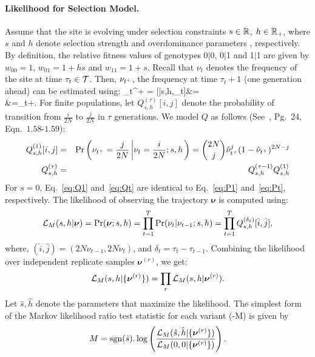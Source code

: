 \paragraph{Likelihood for Selection Model.}
Assume that the site is evolving under selection constraints $s\in
{\mathbb R}$, $h\in {\mathbb R}_+$, where $s$ and $h$ denote selection strength and 
overdominance parameters ,
respectively. By definition, the relative fitness values of genotypes
0$|$0, 0$|$1 and 1$|$1 are given by $w_{00}=1$, $w_{01}=1+hs$ and
$w_{11}=1+s$. Recall that $\nu_t$ denotes the frequency of the site at
time $\tau_t\in {\cal T}$. Then, $\nu_{t^+}$, the frequency at time
$\tau_{t}+1$ (one generation ahead) can be estimated using: \beq 
\hat{\nu}_{t^+} =
[\nusp|s,h,\nu_t]&=\\
&=\nu_t+.
  \label{eq:transition}
\eeq
For finite populations, let $Q^{(\tau)}_{s,h}[i,j]$ denote the
probability of transition from $\frac{i}{2N}$ to $\frac{j}{2N}$ in
$\tau$ generations. We model $Q$ as follows
(See~\cite{Ewens2012Mathematical}, Pg.~24, Eqn.~$1.58$-$1.59$):
\begin{eqnarray}
  Q^{(1)}_{s,h}[i,j] &=& \operatorname{Pr}\left(\nu_{t^+}=\frac{j}{2N} \left\lvert
      \nu_{t}=\frac{i}{2N};s,h \right .\right)={2N \choose j}
  \hat{\nu}_{t^+}^{j} (1-\hat{\nu}_{t^+})^{2N-j}\label{eq:Q1}\\
  Q^{(\tau)}_{s,h} &=& Q^{(\tau-1)}_{s,h}Q^{(1)}_{s,h}\label{eq:Qt}
  \label{eq:mkvs}   
\end{eqnarray}
For $s=0$, Eq.~\ref{eq:Q1} and~\ref{eq:Qt} are identical to
Eq.~\ref{eq:P1} and~\ref{eq:Pt}, respectively.  The likelihood of
observing the trajectory $\bm{\nu}$ is computed using:
\begin{equation}
  {\cal L}_M(s,h|\bm{\nu}) = \operatorname{Pr}(\bm{\nu};s,h)=
  \prod_{t=1}^{T} \operatorname{Pr}(\nu_{t}|\nu_{t-1};s,h) = \prod_{t=1}^{T} 
  Q^{(\delta_t)}_{s,h}[\hat{i},\hat{j}],
\end{equation}
where, $(\hat{i},\hat{j})=( 2N\nu_{t-1}, 2N\nu_{t})$, and
$\delta_t=\tau_{t}-\tau_{t-1}$.  Combining the likelihood over
independent replicate samples $\bm{\nu}^{(r)}$, we get:
\begin{equation}
  {\cal L}_M(s,h|\{\bm{\nu}^{(r)}\}) = \prod_r   {\cal L}_M(s,h|\bm{\nu}^{(r)}).
  \label{eq:mkvlik}
\end{equation}
Let $\hat{s},\hat{h}$ denote the parameters that maximize the
likelihood. The simplest form of the Markov likelihood ratio test statistic  
for each variant (\comale-M) is given by
\begin{eqnarray}
M=\operatorname{sgn} (\hat{s}). \log 
\left(\frac{{\cal L}_M(\hat{s},\hat{h}|\{\bm{\nu}^{(r)}\})}{{\cal L}_M(0,0|\{\bm{\nu}^{(r)}\})}\right).
\label{eq:mcts}
\end{eqnarray}




